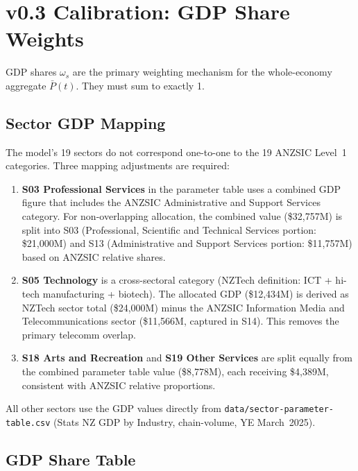 \documentclass[11pt,a4paper]{article}
\begin{document}
\section{v0.3 Calibration: GDP Share Weights}
\label{sec:cal_gdp}

GDP shares $\omega_s$ are the primary weighting mechanism for the whole-economy aggregate $\bar{P}(t)$. They must sum to exactly 1.

\subsection{Sector GDP Mapping}

The model's 19 sectors do not correspond one-to-one to the 19 ANZSIC Level~1 categories. Three mapping adjustments are required:

\begin{enumerate}[label=\arabic*.]
  \item \textbf{S03 Professional Services} in the parameter table uses a combined GDP figure that includes the ANZSIC Administrative and Support Services category. For non-overlapping allocation, the combined value (\$32,757M) is split into S03 (Professional, Scientific and Technical Services portion: \$21,000M) and S13 (Administrative and Support Services portion: \$11,757M) based on ANZSIC relative shares.

  \item \textbf{S05 Technology} is a cross-sectoral category (NZTech definition: ICT + hi-tech manufacturing + biotech). The allocated GDP (\$12,434M) is derived as NZTech sector total (\$24,000M) minus the ANZSIC Information Media and Telecommunications sector (\$11,566M, captured in S14). This removes the primary telecomm overlap.

  \item \textbf{S18 Arts and Recreation} and \textbf{S19 Other Services} are split equally from the combined parameter table value (\$8,778M), each receiving \$4,389M, consistent with ANZSIC relative proportions.
\end{enumerate}

All other sectors use the GDP values directly from \texttt{data/sector-parameter-table.csv} (Stats NZ GDP by Industry, chain-volume, YE March~2025).

\subsection{GDP Share Table}
\end{document}
